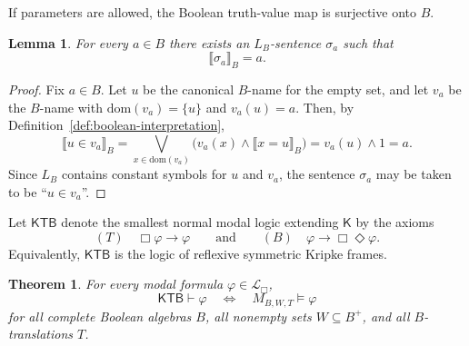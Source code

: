 \documentclass[11pt]{amsart}
\theoremstyle{definition}
\theoremstyle{plain}
\newtheorem{theorem}[definition]{Theorem}
\newtheorem{lemma}[definition]{Lemma}
\newcommand{\Lbox}{\mathcal L_{\Box}} %
\newcommand{\KTB}{\mathsf{KTB}}
\begin{document}
If parameters are allowed, the Boolean truth-value map is surjective onto $B$.

\begin{lemma}\label{lem:truth-value-surjective}
For every $a\in B$ there exists an $L_B$-sentence $\sigma_a$ such that
\[
\llbracket \sigma_a\rrbracket_B=a.
\]
\end{lemma}

\begin{proof}
Fix $a\in B$. Let $u$ be the canonical $B$-name for the empty set, and let $v_a$ be the $B$-name
with $\mathrm{dom}(v_a)=\{u\}$ and $v_a(u)=a$. Then, by Definition~\ref{def:boolean-interpretation},
\[
\llbracket u\in v_a\rrbracket_B
=\bigvee_{x\in\mathrm{dom}(v_a)}\bigl(v_a(x)\wedge \llbracket x=u\rrbracket_B\bigr)
=v_a(u)\wedge 1
=a.
\]
Since $L_B$ contains constant symbols for $u$ and $v_a$, the sentence $\sigma_a$ may be taken to
be ``$u\in v_a$''.
\end{proof}

Let $\KTB$ denote the smallest normal modal logic extending $\mathsf{K}$ by the axioms
\[
(T)\quad \Box\varphi\to\varphi
\qquad\text{and}\qquad
(B)\quad \varphi\to\Box\Diamond\varphi.
\]
Equivalently, $\KTB$ is the logic of reflexive symmetric Kripke frames.

\begin{theorem}\label{thm:KTB-completeness}
For every modal formula $\varphi\in \Lbox$,
\[
\KTB\vdash \varphi
\quad\Longleftrightarrow\quad
M_{B,W,T}\models \varphi
\]
for all complete Boolean algebras $B$, all nonempty sets $W\subseteq B^+$, and all
$B$-translations $T$.
\end{theorem}
\end{document}
